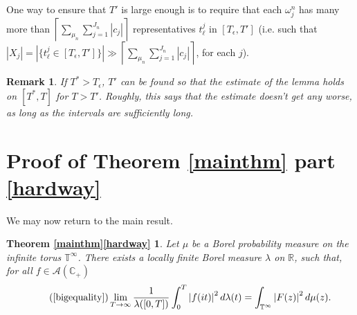 \documentclass[]{elsarticle}
\newcommand{\R}{\mathbb{R}}
\newcommand{\T}{\mathbb{T}}
\newcommand{\cA}{\mathcal{A}}
\newcommand{\cplus}{\mathbb{C}_{+}}
\numberwithin{equation}{section}
\newtheorem*{mythma}{Theorem \ref{mainthm}\ref{hardway}}
\newtheorem{remark}[prop]{Remark}
\begin{document}
        One way to ensure that $T'$ is large enough is to require that each $\omega_j^n$ has many more than $\left\lceil \sum_{\mu_n} \sum_{j=1}^{{J_n}} |c_j| \right\rceil$ representatives $t_\ell^j$ in $[T_\epsilon, T']$ (i.e. such that $|X_j|=|\{t_\ell^j\in [T_\epsilon, T']\}|\gg \left\lceil \sum_{\mu_n} \sum_{j=1}^{{J_n}} |c_j| \right\rceil$, for each $j$).
      \begin{remark}
        If $T^{*}>T_\epsilon$,  $T'$ can be found so that the estimate of the lemma holds on $[T^{*},T]$ for $T>T'$. Roughly, this says that the estimate doesn't get any worse, as long as the intervals are sufficiently long.
      \end{remark}

\section{Proof of Theorem \ref{mainthm} part \ref{hardway}} %
  \label{secproof_of_theorem_mainthm}
    We may now return to the main result.
    \begin{mythma} 
      Let \(\mu\) be a Borel probability measure on the infinite torus \(\T^{\infty}\). There exists a locally finite Borel measure \(\lambda\) on $\R$, such that, for all $f \in \cA(\cplus)$
      \begin{equation} \tag{\ref{bigequality}}
        \lim_{T \to \infty} \frac{1}{\lambda([0,T])} \int_{0}^{T}\left|f(it)\right|^2 d\lambda(t)
        = \int_{\T^{\infty}} \left| F(z)\right|^2 d\mu(z).
      \end{equation} 
    \end{mythma}
\end{document}
